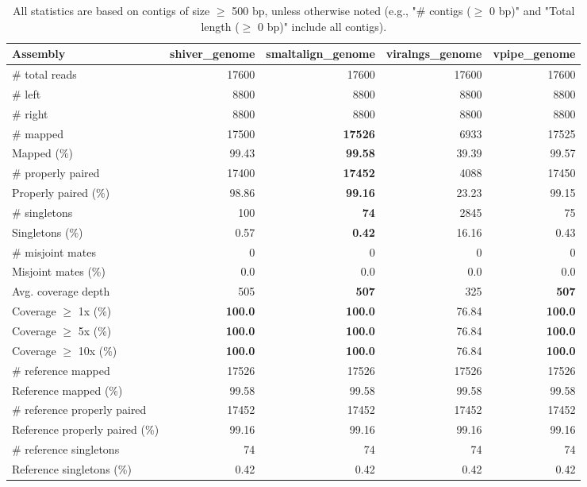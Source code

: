 \documentclass[12pt,a4paper]{article}
\begin{document}
\begin{table}[ht]
\begin{center}
\caption{All statistics are based on contigs of size $\geq$ 500 bp, unless otherwise noted (e.g., "\# contigs ($\geq$ 0 bp)" and "Total length ($\geq$ 0 bp)" include all contigs).}
\begin{tabular}{|l*{4}{|r}|}
\hline
Assembly & shiver\_genome & smaltalign\_genome & viralngs\_genome & vpipe\_genome \\ \hline
\# total reads & 17600 & 17600 & 17600 & 17600 \\ \hline
\# left & 8800 & 8800 & 8800 & 8800 \\ \hline
\# right & 8800 & 8800 & 8800 & 8800 \\ \hline
\# mapped & 17500 & {\bf 17526} & 6933 & 17525 \\ \hline
Mapped (\%) & 99.43 & {\bf 99.58} & 39.39 & 99.57 \\ \hline
\# properly paired & 17400 & {\bf 17452} & 4088 & 17450 \\ \hline
Properly paired (\%) & 98.86 & {\bf 99.16} & 23.23 & 99.15 \\ \hline
\# singletons & 100 & {\bf 74} & 2845 & 75 \\ \hline
Singletons (\%) & 0.57 & {\bf 0.42} & 16.16 & 0.43 \\ \hline
\# misjoint mates & 0 & 0 & 0 & 0 \\ \hline
Misjoint mates (\%) & 0.0 & 0.0 & 0.0 & 0.0 \\ \hline
Avg. coverage depth & 505 & {\bf 507} & 325 & {\bf 507} \\ \hline
Coverage $\geq$ 1x (\%) & {\bf 100.0} & {\bf 100.0} & 76.84 & {\bf 100.0} \\ \hline
Coverage $\geq$ 5x (\%) & {\bf 100.0} & {\bf 100.0} & 76.84 & {\bf 100.0} \\ \hline
Coverage $\geq$ 10x (\%) & {\bf 100.0} & {\bf 100.0} & 76.84 & {\bf 100.0} \\ \hline
\# reference mapped & 17526 & 17526 & 17526 & 17526 \\ \hline
Reference mapped (\%) & 99.58 & 99.58 & 99.58 & 99.58 \\ \hline
\# reference properly paired & 17452 & 17452 & 17452 & 17452 \\ \hline
Reference properly paired (\%) & 99.16 & 99.16 & 99.16 & 99.16 \\ \hline
\# reference singletons & 74 & 74 & 74 & 74 \\ \hline
Reference singletons (\%) & 0.42 & 0.42 & 0.42 & 0.42 \\ \hline

\end{tabular}
\end{center}
\end{table}
\end{document}
